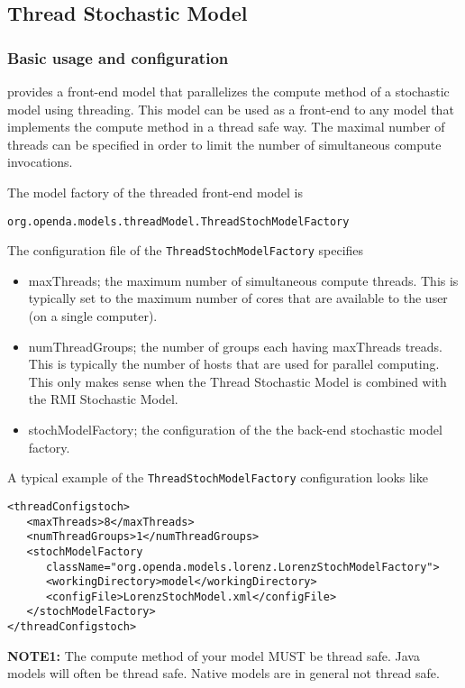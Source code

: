\subsection{Thread Stochastic Model}
\subsubsection{Basic usage and configuration}
\oda provides a front-end model that parallelizes the compute method of a
stochastic model using threading. This model can be used as a front-end to any
\oda model that implements the compute method in a thread safe way. The maximal
number of threads can be specified in order to limit the number of simultaneous
compute invocations.

The model factory of the threaded front-end model is
\begin{verbatim}
org.openda.models.threadModel.ThreadStochModelFactory
\end{verbatim}

The configuration file of the {\tt ThreadStochModelFactory} specifies
\begin{itemize}
\item maxThreads; the maximum number of simultaneous compute threads. This is typically set to the
	maximum number of cores that are available to the user (on a single computer).
\item numThreadGroups; the number of groups each having maxThreads treads. This is typically the number of 
      hosts that are used for parallel computing. This only makes sense when the Thread Stochastic Model is combined
      with the RMI Stochastic Model.
\item stochModelFactory; the configuration of the the back-end stochastic model factory.
\end{itemize}

A typical example of the {\tt ThreadStochModelFactory} configuration looks like
{\small
\begin{verbatim}
<threadConfigstoch>
   <maxThreads>8</maxThreads>
   <numThreadGroups>1</numThreadGroups>
   <stochModelFactory
      className="org.openda.models.lorenz.LorenzStochModelFactory">
      <workingDirectory>model</workingDirectory>
      <configFile>LorenzStochModel.xml</configFile>
   </stochModelFactory>
</threadConfigstoch>
\end{verbatim}
}

{\bf NOTE1:} The compute method of your model MUST be thread safe. Java models
will often be thread safe. Native models are in general not thread safe.\\

